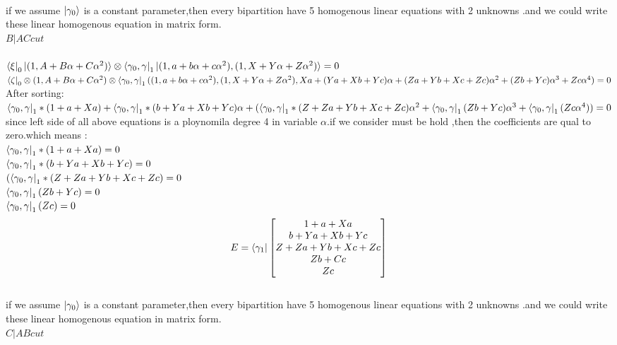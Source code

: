 \documentclass[12pt,twoside]{report}
\begin{document}
 \\
  if we assume $ \ket{\gamma_{0}}$ is a constant parameter,then every bipartition have 5 homogenous linear  equations with 2 unknowns .and we could write these linear homogenous equation in matrix form.\\
 $ B|AC cut $\\
 \\
 $ \bra{\xi}_{0}\ket{(1,A+B\alpha+C\alpha^{2})}\otimes\bra{\gamma_{0},\gamma}_{1}\ket{(1,a+b\alpha+c\alpha^{2}),(1,X+Y\alpha+Z\alpha^{2})}=0 $\\
 $ \bra{\zeta}_{0}\otimes(1,A+B\alpha+C\alpha^{2})\otimes\bra{\gamma_{0},\gamma}_{1}((1,a+b\alpha+c\alpha^{2}),(1,X+Y\alpha+Z\alpha^{2}),Xa+(Ya+Xb+Yc)\alpha+(Za+Yb+Xc+Zc)\alpha^{2}+(Zb+Yc)\alpha^{3}+Zc\alpha^{4})=0 $\\
 After sorting:\\
 $ \bra{\gamma_{0},\gamma}_{1}*(1+a+Xa)+\bra{\gamma_{0},\gamma}_{1}*(b+Ya+Xb+Yc)\alpha+(\bra{\gamma_{0},\gamma}_{1}*(Z+Za+Yb+Xc+Zc)\alpha^{2}+\bra{\gamma_{0},\gamma}_{1}(Zb+Yc)\alpha^{3}+\bra{\gamma_{0},\gamma}_{1}(Zc\alpha^{4}))=0$
 \\
 since left side of all above equations is a ploynomila degree 4 in variable $\alpha$.if we consider must be hold ,then the coefficients are qual to zero.which means :
 \\
 $ \bra{\gamma_{0},\gamma}_{1}*(1+a+Xa) =0$\\
 $\bra{\gamma_{0},\gamma}_{1}*(b+Ya+Xb+Yc)=0  $\\
 $ (\bra{\gamma_{0},\gamma}_{1}*(Z+Za+Yb+Xc+Zc)=0 $\\
 $ \bra{\gamma_{0},\gamma}_{1}(Zb+Yc)=0 $\\
 $ \bra{\gamma_{0},\gamma}_{1}(Zc)=0 $
 \\
 \begin{equation}
 E=\bra{\gamma_{1}}
 \begin{bmatrix}
 1+a+Xa\\
 b+Ya+Xb+Yc\\
 Z+Za+Yb+Xc+Zc\\
 Zb+Cc\\
 Zc
 \end{bmatrix}
 \end{equation}
 \\
  if we assume $ \ket{\gamma_{0}}$ is a constant parameter,then every bipartition have 5 homogenous linear  equations with 2 unknowns .and we could write these linear homogenous equation in matrix form.\\
  $ C|AB cut $\\
\end{document}
